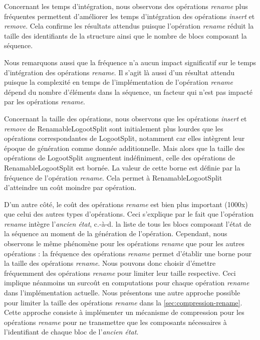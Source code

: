 \documentclass[12pt]{thesul}
\newcommand{\ie}{c.-à-d. }
\begin{document}
Concernant les temps d'intégration, nous observons des opérations \emph{rename} plus fréquentes permettent d'améliorer les temps d'intégration des opérations \emph{insert} et \emph{remove}.
Cela confirme les résultats attendus puisque l'opération \emph{rename} réduit la taille des identifiants de la structure ainsi que le nombre de blocs composant la séquence.

Nous remarquons aussi que la fréquence n'a aucun impact significatif sur le temps d'intégration des opérations \emph{rename}.
Il s'agit là aussi d'un résultat attendu puisque la complexité en temps de l'implémentation de l'opération \emph{rename} dépend du nombre d'éléments dans la séquence, un facteur qui n'est pas impacté par les opérations \emph{rename}.

Concernant la taille des opérations, nous observons que les opérations \emph{insert} et \emph{remove} de RenamableLogootSplit sont initialement plus lourdes que les opérations correspondantes de LogootSplit, notamment car elles intègrent leur époque de génération comme donnée additionnelle.
Mais alors que la taille des opérations de LogootSplit augmentent indéfiniment, celle des opérations de RenamableLogootSplit est bornée.
La valeur de cette borne est définie par la fréquence de l'opération \emph{rename}.
Cela permet à RenamableLogootSplit d'atteindre un coût moindre par opération.

D'un autre côté, le coût des opérations \emph{rename} est bien plus important (1000x) que celui des autres types d'opérations.
Ceci s'explique par le fait que l'opération \emph{rename} intègre l'\emph{ancien état}, \ie la liste de tous les blocs composant l'état de la séquence au moment de la génération de l'opération.
Cependant, nous observons le même phénomène pour les opérations \emph{rename} que pour les autres opérations : la fréquence des opérations \emph{rename} permet d'établir une borne pour la taille des opérations \emph{rename}.
Nous pouvons donc choisir d'émettre fréquemment des opérations \emph{rename} pour limiter leur taille respective.
Ceci implique néanmoins un surcoût en computations pour chaque opération \emph{rename} dans l'implémentation actuelle.
Nous présentons une autre approche possible pour limiter la taille des opérations \emph{rename} dans la \autoref{sec:compression-rename}.
Cette approche consiste à implémenter un mécanisme de compression pour les opérations \emph{rename} pour ne transmettre que les composants nécessaires à l'identifiant de chaque bloc de l'\emph{ancien état}.
\end{document}
